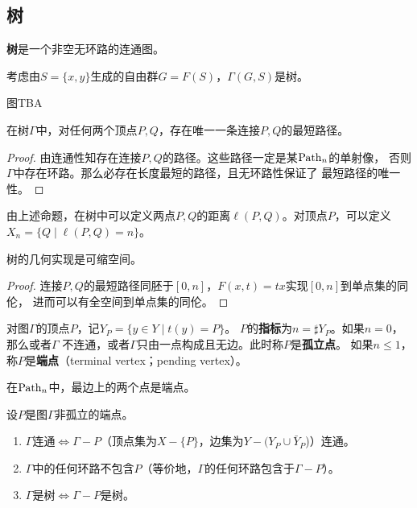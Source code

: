 \subsection{树}
\begin{definition}
    \textbf{树}是一个非空无环路的连通图。
\end{definition}
\begin{example}
    考虑由$S = \{x,y\}$生成的自由群$G = F(S)$，$\Gamma(G,S)$是树。

    图TBA
\end{example}
\begin{proposition}
    在树$\Gamma$中，对任何两个顶点$P,Q$，存在唯一一条连接$P,Q$的最短路径。
\end{proposition}
\begin{proof}
    由连通性知存在连接$P,Q$的路径。这些路径一定是某$\operatorname{Path}_n$的单射像，
    否则$\Gamma$中存在环路。那么必存在长度最短的路径，且无环路性保证了
    最短路径的唯一性。
\end{proof}
由上述命题，在树中可以定义两点$P,Q$的距离$\ell(P,Q)$。对顶点$P$，可以定义$X_n = \{Q \mid \ell(P,Q) = n\}$。
\begin{proposition}
    树的几何实现是可缩空间。
\end{proposition}
\begin{proof}
    连接$P,Q$的最短路径同胚于$[0,n]$，$F(x,t) = tx$实现$[0,n]$到单点集的同伦，
    进而可以有全空间到单点集的同伦。
\end{proof}
\begin{definition}
    对图$\Gamma$的顶点$P$，记$Y_P = \{y \in Y \mid t(y) = P\}$。
    $P$的\textbf{指标}为$n = \sharp Y_P$。如果$n = 0$，那么或者$\Gamma$
    不连通，或者$\Gamma$只由一点构成且无边。此时称$P$是\textbf{孤立点}。
    如果$n \leqslant 1$，称$P$是\textbf{端点}（terminal vertex；pending vertex）。
\end{definition}
\begin{example}
    在$\operatorname{Path}_n$中，最边上的两个点是端点。
\end{example}
\begin{proposition}
    设$P$是图$\Gamma$非孤立的端点。
    \begin{enumerate}
        \item $\Gamma$连通$\iff \Gamma - P$（顶点集为$X-\{P\}$，边集为$Y-(Y_P \cup \bar{Y}_P$)）连通。
        \item $\Gamma$中的任何环路不包含$P$（等价地，$\Gamma$的任何环路包含于$\Gamma - P$）。
        \item $\Gamma$是树$\iff \Gamma - P$是树。
    \end{enumerate}
\end{proposition}
